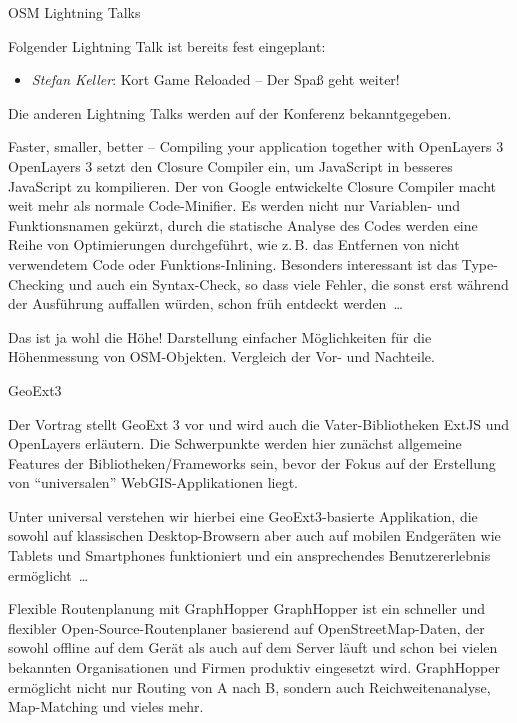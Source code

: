 \abstractGiStudio{}%
{OSM Lightning Talks}%
{}%
{Folgender Lightning Talk ist bereits fest eingeplant:
	\begin{itemize}
		\RaggedRight
		\setlength{\itemsep}{-2pt} %
		\item \emph{Stefan Keller}: Kort Game Reloaded -- Der Spaß geht weiter!
	\end{itemize}
	\justifying
Die anderen Lightning Talks werden auf der Konferenz bekanntgegeben.
}

%
{Faster, smaller, better -- Compiling your application together with OpenLayers 3}%
{}%
{OpenLayers 3 setzt den Closure Compiler ein, um Java\-Script in besseres JavaScript zu kompilieren.
Der von Google entwickelte Closure Compiler macht weit mehr als normale Code-Minifier.
Es werden nicht nur Variablen- und Funk\-tionsnamen gekürzt, durch die statische Analyse
des Codes werden eine Reihe von Optimierungen durchgeführt, wie z.\,B. das Entfernen
von nicht verwendetem Code oder Funktions-Inlining. Besonders interessant ist das
Type-Checking und auch ein Syntax-Check, so dass viele Fehler, die sonst erst während
der Ausführung auffallen würden, schon früh entdeckt werden~\dots}

%
{Das ist ja wohl die Höhe!}%
{}%
{Darstellung einfacher Möglichkeiten für die Höhenmessung von OSM-Objekten. Vergleich der Vor- und Nachteile.}

%
{GeoExt3}%
{}%
{Der Vortrag stellt GeoExt 3 vor und wird auch die Vater-Bibliotheken ExtJS
und OpenLayers erläutern. Die Schwer\-punkte werden hier zunächst allgemeine
Features der Bibliotheken/Frameworks sein, bevor der Fokus auf der Erstellung
von "`universalen"' WebGIS-Applikationen liegt.

Unter universal verstehen wir
hierbei eine GeoExt3-basierte Applikation, die sowohl auf klassischen
Desktop-Browsern aber auch auf mobilen Endgeräten wie Tablets und Smartphones
funktioniert und ein ansprechendes Benutzererlebnis ermöglicht~\dots}

%
{Flexible Routenplanung mit GraphHopper}%
{}%
{GraphHopper ist ein schneller und flexibler Open-Source-Routenplaner basierend auf OpenStreetMap-Daten,
der sowohl offline auf dem Gerät als auch auf dem Server läuft und schon bei vielen bekannten Organisationen
und Firmen produktiv eingesetzt wird. GraphHopper ermöglicht nicht nur Routing von A nach B, sondern auch
Reichweitenanalyse, Map-Matching und vieles mehr.}

